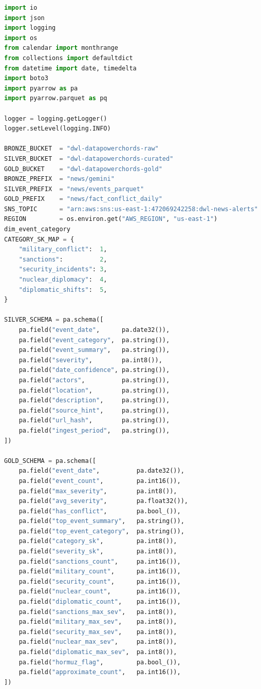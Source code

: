 \documentclass[11pt,a4paper]{article}
\begin{document}
\label{appx:newstransform}
\begin{lstlisting}[language=Python,
caption={News transformation},
label={lst:newstransform _lambda}]
import io
import json
import logging
import os
from calendar import monthrange
from collections import defaultdict
from datetime import date, timedelta
import boto3
import pyarrow as pa
import pyarrow.parquet as pq

logger = logging.getLogger()
logger.setLevel(logging.INFO)

BRONZE_BUCKET  = "dwl-datapowerchords-raw"
SILVER_BUCKET  = "dwl-datapowerchords-curated"
GOLD_BUCKET    = "dwl-datapowerchords-gold"
BRONZE_PREFIX  = "news/gemini"
SILVER_PREFIX  = "news/events_parquet"
GOLD_PREFIX    = "news/fact_conflict_daily"
SNS_TOPIC      = "arn:aws:sns:us-east-1:472069242258:dwl-news-alerts"
REGION         = os.environ.get("AWS_REGION", "us-east-1")
dim_event_category
CATEGORY_SK_MAP = {
    "military_conflict":  1,
    "sanctions":          2,
    "security_incidents": 3,
    "nuclear_diplomacy":  4,
    "diplomatic_shifts":  5,
}

SILVER_SCHEMA = pa.schema([
    pa.field("event_date",      pa.date32()),
    pa.field("event_category",  pa.string()),
    pa.field("event_summary",   pa.string()),
    pa.field("severity",        pa.int8()),
    pa.field("date_confidence", pa.string()),
    pa.field("actors",          pa.string()),
    pa.field("location",        pa.string()),
    pa.field("description",     pa.string()),
    pa.field("source_hint",     pa.string()),
    pa.field("url_hash",        pa.string()),
    pa.field("ingest_period",   pa.string()),
])

GOLD_SCHEMA = pa.schema([
    pa.field("event_date",          pa.date32()),
    pa.field("event_count",         pa.int16()),
    pa.field("max_severity",        pa.int8()),
    pa.field("avg_severity",        pa.float32()),
    pa.field("has_conflict",        pa.bool_()),
    pa.field("top_event_summary",   pa.string()),
    pa.field("top_event_category",  pa.string()),
    pa.field("category_sk",         pa.int8()),
    pa.field("severity_sk",         pa.int8()),
    pa.field("sanctions_count",     pa.int16()),
    pa.field("military_count",      pa.int16()),
    pa.field("security_count",      pa.int16()),
    pa.field("nuclear_count",       pa.int16()),
    pa.field("diplomatic_count",    pa.int16()),
    pa.field("sanctions_max_sev",   pa.int8()),
    pa.field("military_max_sev",    pa.int8()),
    pa.field("security_max_sev",    pa.int8()),
    pa.field("nuclear_max_sev",     pa.int8()),
    pa.field("diplomatic_max_sev",  pa.int8()),
    pa.field("hormuz_flag",         pa.bool_()),
    pa.field("approximate_count",   pa.int16()),
])


\end{lstlisting}
\end{document}
